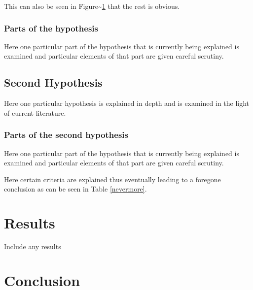 \documentclass[
  12pt,
  notitlepage]{isuthesis}
\begin{document}
This can also be seen in Figure\textasciitilde{}\ref{moon} that the
rest is obvious.

\begin{figure}[h!tb] \centering

\vspace{ 2 in}
\label{moon}
\end{figure}

\subsubsection{Parts of the hypothesis}

Here one particular part of the hypothesis that is
currently being explained is examined and particular
elements of that part are given careful scrutiny.

\subsection{Second Hypothesis}

Here one particular hypothesis is explained in depth
and is examined in the light of current literature.

\subsubsection{Parts of the second hypothesis}

Here one particular part of the hypothesis that is
currently being explained is examined and particular
elements of that part are given careful scrutiny.

Here certain criteria are explained thus eventually
leading to a foregone conclusion as can be seen in
Table \ref{nevermore}.

\begin{table}[h!tb] \centering
\setlength{\captionwidth}{3.5 in}
\label{nevermore}

\vspace{ 2 in}
\end{table}

\section{Results}

Include any results

\section{Conclusion}\label{conclusion2}
\end{document}
